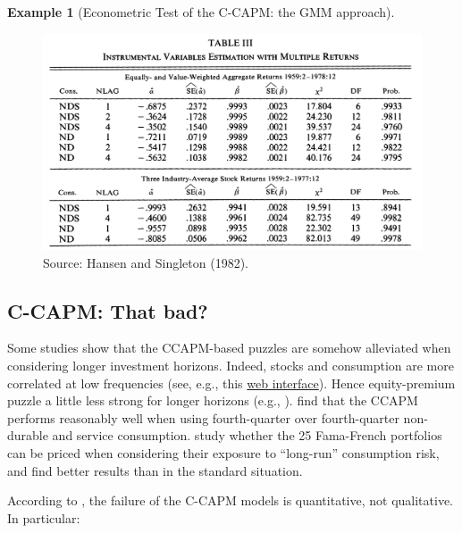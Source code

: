 \documentclass[
  12pt,
]{book}
\theoremstyle{definition}
\theoremstyle{definition}
\newtheorem{example}{Example}[chapter]
\theoremstyle{definition}
\theoremstyle{definition}
\theoremstyle{remark}
\begin{document}
\begin{example}[Econometric Test of the C-CAPM: the GMM approach]
\begin{figure}
{\centering \includegraphics[width=1\linewidth]{figures/tableHansenSingleton82A} 

}

\caption{Source: Hansen and Singleton (1982).}\label{fig:HansenSinfgleton1982}
\end{figure}

\end{example}

\hypertarget{c-capm-that-bad}{%
\subsection{C-CAPM: That bad?}\label{c-capm-that-bad}}

Some studies show that the CCAPM-based puzzles are somehow alleviated when considering longer investment horizons. Indeed, stocks and consumption are more correlated at low frequencies (see, e.g., this \href{https://jrenne.shinyapps.io/APModels}{web interface}). Hence equity-premium puzzle a little less strong for longer horizons (e.g., \citet{DANIEL_MARSHALL_1997}). \citet{Jagannathan_Wang_2007} find that the CCAPM performs reasonably well when using fourth-quarter over fourth-quarter non-durable and service consumption. \citet{Parker_Julliard_2005} study whether the 25 Fama-French portfolios can be priced when considering their exposure to ``long-run'' consumption risk, and find better results than in the standard situation.

According to \citet{Cochrane_2005}, the failure of the C-CAPM models is quantitative, not qualitative. In particular:
\end{document}
